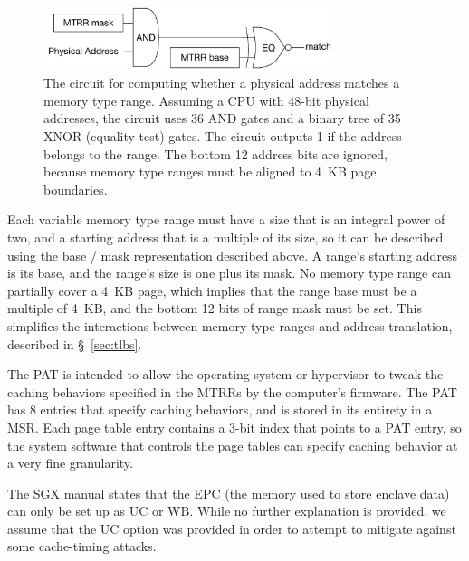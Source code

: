 \begin{figure}[hbt]
  \centering
  \includegraphics[width=85mm]{figures/mtrr_match.pdf}
  \caption{
    The circuit for computing whether a physical address matches a memory type
    range.  Assuming a CPU with 48-bit physical addresses, the circuit uses 36
    AND gates and a binary tree of 35 XNOR (equality test) gates. The circuit
    outputs 1 if the address belongs to the range. The bottom 12 address
    bits are ignored, because memory type ranges must be aligned to 4~KB page
    boundaries.
  }
  \label{fig:mtrr_match}
\end{figure}

Each variable memory type range must have a size that is an integral power of
two, and a starting address that is a multiple of its size, so it can be
described using the base / mask representation described above. A range's
starting address is its base, and the range's size is one plus its mask. No
memory type range can partially cover a 4~KB page, which implies that the range
base must be a multiple of 4~KB, and the bottom 12 bits of range mask must be
set. This simplifies the interactions between memory type ranges and address
translation, described in \S~\ref{sec:tlbs}.

The PAT is intended to allow the operating system or hypervisor to tweak the
caching behaviors specified in the MTRRs by the computer's firmware. The PAT
has 8 entries that specify caching behaviors, and is stored in its entirety in
a MSR. Each page table entry contains a 3-bit index that points to a PAT entry,
so the system software that controls the page tables can specify caching
behavior at a very fine granularity.

The SGX manual states that the EPC (the memory used to store enclave data) can
only be set up as UC or WB. While no further explanation is provided, we assume
that the UC option was provided in order to attempt to mitigate against some
cache-timing attacks.
